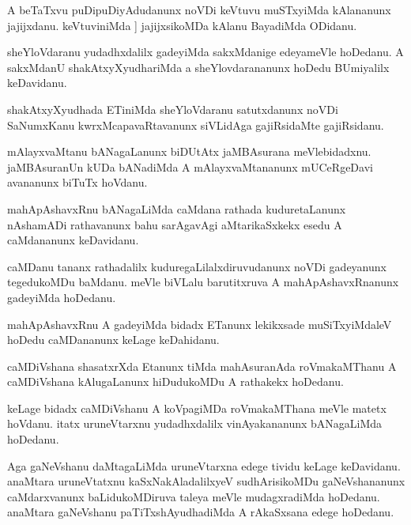 \documentclass{article}
\begin{document}
\begin{mn}%
A beTaTxvu puDipuDiyAdudanunx noVDi keVtuvu muSTxyiMda kAlananunx jajijxdanu. keVtuviniMda ]
jajijxsikoMDa kAlanu BayadiMda ODidanu.
\end{mn}

\begin{mn}%
sheYloVdaranu yudadhxdalilx gadeyiMda sakxMdanige edeyameVle hoDedanu. A sakxMdanU 
shakAtxyXyudhariMda a sheYlovdarananunx hoDedu BUmiyalilx keDavidanu.
\end{mn}

\begin{mn}%
shakAtxyXyudhada ETiniMda sheYloVdaranu satutxdanunx noVDi SaNumxKanu kwrxMcapavaRtavanunx 
siVLidAga gajiRsidaMte gajiRsidanu.
\end{mn}

\begin{mn}%
mAlayxvaMtanu bANagaLanunx biDUtAtx jaMBAsurana meVlebidadxnu. jaMBAsuranUn kUDa bANadiMda A 
mAlayxvaMtananunx mUCeRgeDavi avananunx biTuTx hoVdanu.
\end{mn}

\begin{mn}%
mahApAshavxRnu bANagaLiMda caMdana rathada kuduretaLanunx nAshamADi rathavanunx bahu 
sarAgavAgi aMtarikaSxkekx esedu A caMdananunx keDavidanu.
\end{mn}

\begin{mn}%
caMDanu tananx rathadalilx kuduregaLilalxdiruvudanunx noVDi gadeyanunx tegedukoMDu baMdanu. 
meVle biVLalu barutitxruva A mahApAshavxRnanunx gadeyiMda hoDedanu.
\end{mn}

\begin{mn}%
mahApAshavxRnu A gadeyiMda bidadx ETanunx lekikxsade muSiTxyiMdaleV hoDedu caMDananunx 
keLage keDahidanu.
\end{mn}

\begin{mn}%
caMDiVshana shasatxrXda Etanunx tiMda mahAsuranAda roVmakaMThanu A caMDiVshana kAlugaLanunx 
hiDudukoMDu A rathakekx hoDedanu.
\end{mn}

\begin{mn}%
keLage bidadx caMDiVshanu A koVpagiMDa roVmakaMThana meVle matetx hoVdanu. itatx 
uruneVtarxnu yudadhxdalilx vinAyakananunx bANagaLiMda hoDedanu.
\end{mn}

\begin{mn}%
Aga gaNeVshanu daMtagaLiMda uruneVtarxna edege tividu keLage keDavidanu. anaMtara 
uruneVtatxnu kaSxNakAladalilxyeV sudhArisikoMDu gaNeVshananunx caMdarxvanunx 
baLidukoMDiruva taleya meVle mudagxradiMda hoDedanu. anaMtara gaNeVshanu 
paTiTxshAyudhadiMda A rAkaSxsana edege hoDedanu.
\end{mn}
\end{document}
